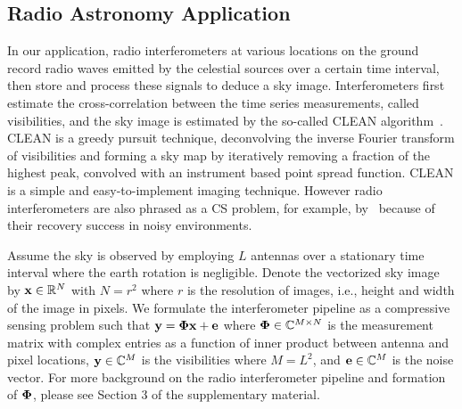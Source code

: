 \documentclass[aoas,preprint]{imsart}
\numberwithin{equation}{section}
\theoremstyle{plain}
\begin{document}
\subsection{Radio Astronomy Application}

In our application, radio interferometers at various locations on the ground record radio waves emitted by the celestial sources over a certain time interval, then store and process these signals to deduce a sky image. Interferometers first estimate the cross-correlation between the time series measurements, called visibilities, and the sky image is estimated by the so-called {CLEAN} algorithm~\cite{hogbom1974clean}. {CLEAN} is a greedy pursuit technique, deconvolving the inverse Fourier transform of visibilities and forming a sky map by iteratively removing a fraction of the highest peak, convolved with an instrument based point spread function. CLEAN is a simple and easy-to-implement imaging technique. However radio interferometers are also phrased as a CS problem, for example, by~\cite{wiaux2009csforra, wenger2010csforra, li2011deconvolution} because of their recovery success in noisy environments.
\vspace{0.5em}

Assume the sky is observed by employing $L$ antennas over a stationary time interval where the earth rotation is negligible. Denote the vectorized sky image by ${\bf x} \in \mathbb{R}^N$ with $N = {r^2}$ where $r$ is the resolution of images, i.e., height and width of the image in pixels. We formulate the interferometer pipeline as a compressive sensing problem such that ${\bf y} = {\bf \Phi} {\bf x} + {\bf e}$ where ${\bf \Phi} \in \mathbb{C}^{M\times N}$ is the measurement matrix with complex entries as a function of inner product between antenna and pixel locations, ${\bf y} \in \mathbb{C}^{M}$ is the visibilities where $M=L^2$, and ${\bf e} \in \mathbb{C}^M$ is the noise vector. For more background on the radio interferometer pipeline and formation of ${\bf \Phi}$, please see Section 3 of the supplementary material.
\end{document}

